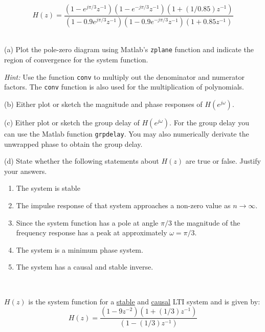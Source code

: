 \documentclass[12pt]{report}
\begin{document}
\begin{equation}
H(z) = \frac{(1-e^{j\pi/3} z^{-1})(1-e^{-j\pi/3}z^{-1})(1+(1/0.85)z^{-1})}{(1-0.9e^{j\pi/3} z^{-1})(1-0.9e^{-j\pi/3}z^{-1})(1+0.85z^{-1})}
\end{equation}
\mbox{}\\ 
\begin{description}
	\item{(a)} Plot the pole-zero diagram using Matlab's \texttt{zplane} function and indicate the region of convergence for the system function. 
	
	\textit{Hint:} Use the function \texttt{conv} to multiply out the denominator and numerator factors. The \texttt{conv} function is also used for the multiplication of polynomials.
	
	\item{(b)} Either plot or sketch the magnitude and phase responses of $H(e^{j\omega})$.
	
	\item{(c)} Either plot or sketch the group delay of $H(e^{j\omega})$. For the group delay you can use the Matlab function \texttt{grpdelay}. You may also numerically derivate the unwrapped phase to obtain the group delay.
	
	\item{(d)} State whether the following statements about $H(z)$ are true or false. Justify your answers. 
	\begin{enumerate}
		\item The system is stable
		\item The impulse response of that system approaches a non-zero value as $n\to\infty$.
		\item Since the system function has a pole at angle $\pi/3$ the magnitude of the frequency response has a peak at approximately $\omega=\pi/3$.
		\item The system is a minimum phase system.
		\item The system has a causal and stable inverse.
	\end{enumerate}
\end{description}
\mbox{}\\ 
\newpage


$H(z)$ is the system function for a \underline{stable} and \underline{causal} LTI system and is given by:
\begin{equation}
H(z) = \frac{(1-9z^{-2})(1+(1/3)z^{-1})}{(1-(1/3)z^{-1})}
\end{equation}
\end{document}

